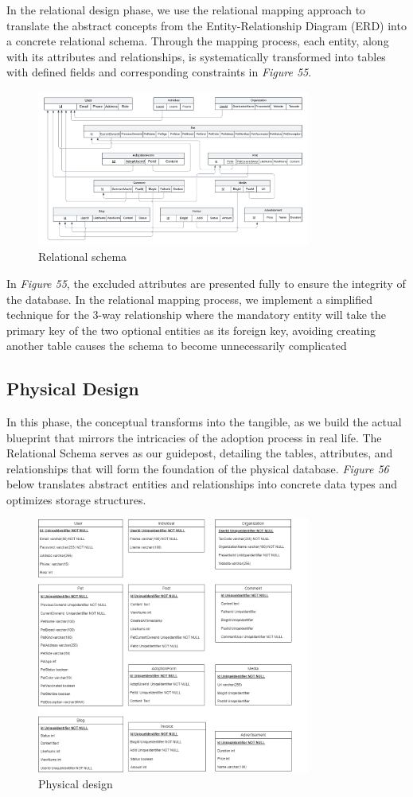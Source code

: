 In the relational design phase, we use the relational mapping approach
to translate the abstract concepts from the Entity-Relationship Diagram
(ERD) into a concrete relational schema. Through the mapping process,
each entity, along with its attributes and relationships, is
systematically transformed into tables with defined fields and
corresponding constraints in \emph{Figure 55}.

\begin {figure}[H]
\centering
\includegraphics[width=0.8\textwidth]{Figures/relational_schema.png}
\caption{Relational schema}
\end{figure}

In \emph{Figure 55}, the excluded attributes are presented fully to
ensure the integrity of the database. In the relational mapping process,
we implement a simplified technique for the 3-way relationship where the
mandatory entity will take the primary key of the two optional entities
as its foreign key, avoiding creating another table causes the schema to
become unnecessarily complicated

\subsection{Physical Design}

In this phase, the conceptual transforms into the tangible, as we build the actual blueprint that mirrors the intricacies of the adoption process in real life. The Relational Schema serves as our guidepost, detailing the tables, attributes, and relationships that will form the foundation of the physical database. \textit{Figure 56} below translates abstract entities and relationships into concrete data types and optimizes storage structures.

\begin {figure}[H]
\centering
\includegraphics[width=0.8\textwidth]{Figures/physical_db.png}
\caption{Physical design}
\end{figure}




